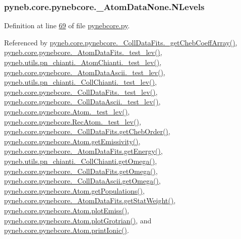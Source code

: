 \hypertarget{classpyneb_1_1core_1_1pynebcore_1_1___atom_data_none_a784a8906a9fd1b408b567989207aca84}{
\subsubsection[{N\-Levels}]{\setlength{\rightskip}{0pt plus 5cm}pyneb.\-core.\-pynebcore.\-\_\-\-Atom\-Data\-None.\-N\-Levels}}\label{classpyneb_1_1core_1_1pynebcore_1_1___atom_data_none_a784a8906a9fd1b408b567989207aca84}


Definition at line \hyperlink{pynebcore_8py_source_l00069}{69} of file \hyperlink{pynebcore_8py_source}{pynebcore.\-py}.



Referenced by \hyperlink{pynebcore_8py_source_l00751}{pyneb.\-core.\-pynebcore.\-\_\-\-Coll\-Data\-Fits.\-\_\-get\-Cheb\-Coeff\-Array()}, \hyperlink{pynebcore_8py_source_l00178}{pyneb.\-core.\-pynebcore.\-\_\-\-Atom\-Data\-Fits.\-\_\-test\-\_\-lev()}, \hyperlink{pn__chianti_8py_source_l00304}{pyneb.\-utils.\-pn\-\_\-chianti.\-\_\-\-Atom\-Chianti.\-\_\-test\-\_\-lev()}, \hyperlink{pynebcore_8py_source_l00447}{pyneb.\-core.\-pynebcore.\-\_\-\-Atom\-Data\-Ascii.\-\_\-test\-\_\-lev()}, \hyperlink{pn__chianti_8py_source_l00472}{pyneb.\-utils.\-pn\-\_\-chianti.\-\_\-\-Coll\-Chianti.\-\_\-test\-\_\-lev()}, \hyperlink{pynebcore_8py_source_l00677}{pyneb.\-core.\-pynebcore.\-\_\-\-Coll\-Data\-Fits.\-\_\-test\-\_\-lev()}, \hyperlink{pynebcore_8py_source_l01045}{pyneb.\-core.\-pynebcore.\-\_\-\-Coll\-Data\-Ascii.\-\_\-test\-\_\-lev()}, \hyperlink{pynebcore_8py_source_l01525}{pyneb.\-core.\-pynebcore.\-Atom.\-\_\-test\-\_\-lev()}, \hyperlink{pynebcore_8py_source_l02672}{pyneb.\-core.\-pynebcore.\-Rec\-Atom.\-\_\-test\-\_\-lev()}, \hyperlink{pynebcore_8py_source_l00711}{pyneb.\-core.\-pynebcore.\-\_\-\-Coll\-Data\-Fits.\-get\-Cheb\-Order()}, \hyperlink{pynebcore_8py_source_l01782}{pyneb.\-core.\-pynebcore.\-Atom.\-get\-Emissivity()}, \hyperlink{pynebcore_8py_source_l00275}{pyneb.\-core.\-pynebcore.\-\_\-\-Atom\-Data\-Fits.\-get\-Energy()}, \hyperlink{pn__chianti_8py_source_l00507}{pyneb.\-utils.\-pn\-\_\-chianti.\-\_\-\-Coll\-Chianti.\-get\-Omega()}, \hyperlink{pynebcore_8py_source_l00828}{pyneb.\-core.\-pynebcore.\-\_\-\-Coll\-Data\-Fits.\-get\-Omega()}, \hyperlink{pynebcore_8py_source_l01082}{pyneb.\-core.\-pynebcore.\-\_\-\-Coll\-Data\-Ascii.\-get\-Omega()}, \hyperlink{pynebcore_8py_source_l01562}{pyneb.\-core.\-pynebcore.\-Atom.\-get\-Populations()}, \hyperlink{pynebcore_8py_source_l00249}{pyneb.\-core.\-pynebcore.\-\_\-\-Atom\-Data\-Fits.\-get\-Stat\-Weight()}, \hyperlink{pynebcore_8py_source_l02384}{pyneb.\-core.\-pynebcore.\-Atom.\-plot\-Emiss()}, \hyperlink{pynebcore_8py_source_l02443}{pyneb.\-core.\-pynebcore.\-Atom.\-plot\-Grotrian()}, and \hyperlink{pynebcore_8py_source_l02233}{pyneb.\-core.\-pynebcore.\-Atom.\-print\-Ionic()}.

